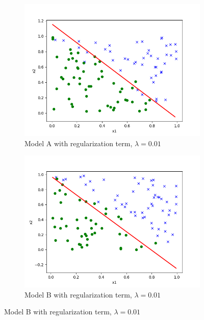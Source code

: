 \begin{answer}
\begin{figure}[H]
  \centering
  \begin{subfigure}[b]{0.49\textwidth}
    \includegraphics[width=\textwidth]{logreg_stability/logreg_pred_a_reg.png}
    \caption*{Model A with regularization term, $\lambda=0.01$}
  \end{subfigure}
  \begin{subfigure}[b]{0.49\textwidth}
    \includegraphics[width=\textwidth]{logreg_stability/logreg_pred_B_reg.png}
    \caption*{Model B with regularization term, $\lambda=0.01$}
  \end{subfigure}
\end{figure}

\end{answer}
